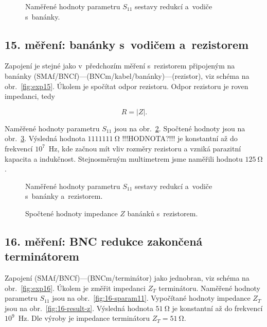 \documentclass{protokol}
\newcommand\sparam{S}
\newcommand\impedance{Z}
\begin{document}
\begin{figure}[htp]
	\centering
	
	\caption{Naměřené hodnoty parametru $\sparam_{11}$
		sestavy redukcí a~vodiče s~banánky.}
	\label{fig:14-sparam}
\end{figure}

\subsection{15. měření: banánky s~vodičem a~rezistorem}
Zapojení je stejné jako v~předchozím měření s~rezistorem připojeným na banánky 
(SMAf/BNCf)---(BNCm/kabel/banánky)---(rezistor), viz schéma na 
obr.~\ref{fig:exp15}. Úkolem je spočítat odpor rezistoru. Odpor rezistoru je 
roven impedanci, tedy 

\begin{equation}
	R = |Z|.
\end{equation}

Naměřené hodnoty parametru $\sparam_{11}$ jsou na obr.~\ref{fig:15-sparam}. 
Spočtené hodnoty jsou na obr.~\ref{fig:15-result-z}. Výsledná hodnota 
$\SI{1111111}{\ohm}$ !!!HODNOTA?!!! je konstantní až do frekvencí 
$10^7$~Hz, kde začnou mít vliv rozměry rezistoru a vzniká parazitní 
kapacita a indukčnost. Stejnosměrným multimetrem jsme naměřili hodnotu 
$\SI{125}{\ohm}$.

\begin{figure}[htp]
	\centering
	
	\caption{Naměřené hodnoty parametru $\sparam_{11}$
		sestavy redukcí a~vodiče s~banánky a~rezistorem.}
	\label{fig:15-sparam}
\end{figure}

\begin{figure}[htp]
	\centering
	
	\caption{Spočtené hodnoty impedance $\impedance$ banánků s~rezistorem.}
	\label{fig:15-result-z}
\end{figure}

\subsection{16. měření: BNC redukce zakončená terminátorem}
Zapojení (SMAf/BNCf)---(BNCm/terminátor) jako jednobran, viz schéma na 
obr.~\ref{fig:exp16}. Úkolem je změřit impedanci $\impedance_{T}$ terminátoru. 
Naměřené hodnoty parametru $\sparam_{11}$ jsou na obr.~\ref{fig:16-sparam11}. 
Vypočítané hodnoty impedance $\impedance_{T}$ jsou na 
obr.~\ref{fig:16-result-z}. Výsledná hodnota 
$\SI{51}{\ohm}$ je konstantní až do frekvencí $10^9$~Hz. Dle výroby 
je impedance terminátoru $Z_{T} = \SI{51}{\ohm}$.
\end{document}
